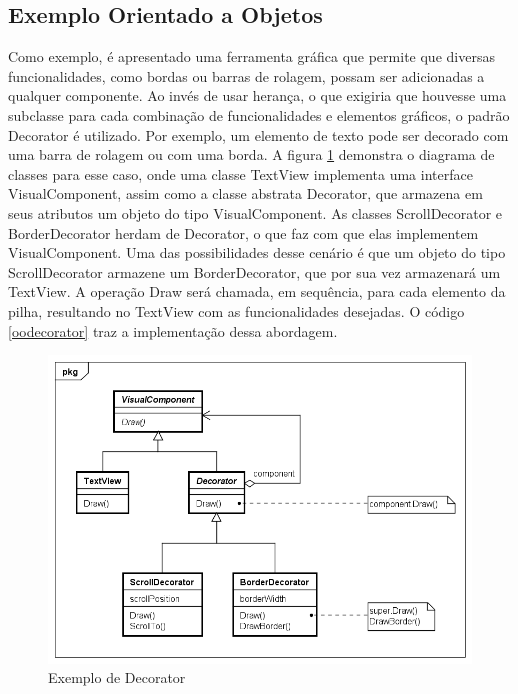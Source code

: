 \subsection*{Exemplo Orientado a Objetos}

Como exemplo, é apresentado uma ferramenta  
gráfica que permite que diversas funcionalidades, 
como bordas ou barras de rolagem, possam ser adicionadas 
a qualquer componente. Ao invés de usar herança, 
o que exigiria que houvesse uma subclasse para cada 
combinação de funcionalidades e elementos gráficos, 
o padrão Decorator é utilizado. Por exemplo, um 
elemento de texto pode ser decorado com uma barra 
de rolagem ou com uma borda. A figura \ref{decorator_exemplo} 
demonstra o diagrama de classes para esse caso, 
onde uma classe TextView implementa uma interface 
VisualComponent, assim como a classe abstrata Decorator, 
que armazena em seus atributos um objeto do tipo 
VisualComponent. As classes ScrollDecorator e 
BorderDecorator herdam de Decorator, o que faz com que 
elas implementem VisualComponent. Uma das 
possibilidades desse cenário é que um objeto do tipo 
ScrollDecorator armazene um BorderDecorator, que 
por sua vez armazenará um TextView. A operação 
Draw será chamada, em sequência, para cada 
elemento da pilha, resultando no TextView 
com as funcionalidades desejadas. O código 
\ref{oodecorator} traz a implementação dessa 
abordagem.

\begin{figure}[htb]
	\caption{\label{decorator_exemplo}Exemplo de Decorator}
	\begin{center}
	    \includegraphics[scale=0.5]{5_padroes-contexto-funcional/5.2_estruturais/5.2.4_decorator/decorator_exemplo.png}
	\end{center}
\end{figure}


